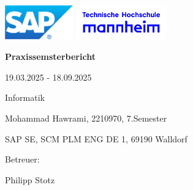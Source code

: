%
%


\begin{titlepage}

    \includegraphics[height=1.5cm]{Bilder/Deckblatt/Logo_SAP.pdf}
    \hfill
    \includegraphics[height=1.5cm]{Bilder/Deckblatt/Hochschule_Mannheim.png}

    
    
    \vspace*{1cm}

    \begin{singlespace}
    \begin{center}
    
    \huge
    \textbf{Praxissemsterbericht}
     	
    \vspace*{1.5cm}
    
    \large
    19.03.2025 - 18.09.2025\\
    
    \vspace*{0.5cm}

    \large
    Informatik \\

    \vspace*{0.5cm}

    \large
    Mohammad Hawrami, 2210970, 7.Semester \\

    \vspace*{0.5cm}

    \large
    SAP SE, SCM PLM ENG DE 1, 69190 Walldorf \\
    
    \vspace*{2.5cm}
    
    \large
    Betreuer: \\
    
    \vspace*{0.5cm}
    
    \Large
    Philipp Stotz \\
    
    \vspace*{2cm}
    
    \end{center}
    \end{singlespace}

\end{titlepage}

